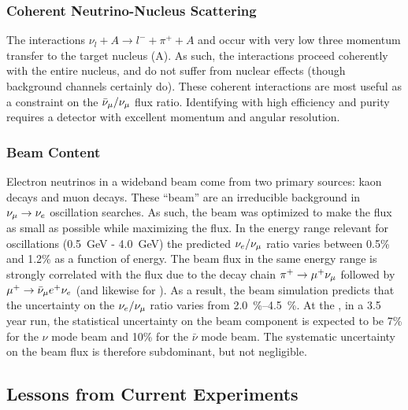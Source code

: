 \subsubsection{Coherent Neutrino-Nucleus Scattering}
The interactions $\nu_l + A \rightarrow l^- + \pi^+ + A$ and 
occur with very low three momentum transfer to the target nucleus (A).  As such, the interactions proceed coherently with the entire nucleus, and do not suffer from nuclear effects (though background channels certainly do). These coherent interactions are most useful as a constraint on the $\bar\nu_\mu/\nu_\mu$ flux ratio. Identifying with high efficiency and purity requires a detector with excellent momentum and angular resolution.

\subsubsection{Beam \nue Content}
\label{ssec:beam-nue}
Electron neutrinos in a wideband beam come from two primary sources: kaon decays and muon decays. These ``beam'' \nue are an irreducible background in $\nu_\mu \to \nu_e$ oscillation searches. As such, the  beam was optimized to make the \nue flux as small as possible while maximizing the \numu flux. In the energy range relevant for oscillations (\SI{0.5}{GeV} - \SI{4.0}{GeV}) the predicted $\nu_e/\nu_\mu$ ratio varies between 0.5\% and 1.2\% as a function of energy. The beam \nue flux in the same energy range is strongly correlated with the \numu flux due to the decay chain $\pi^+\to\mu^+\nu_\mu$ followed by $\mu^+ \to \bar\nu_\mu{} e^+ \nu_e $ (and likewise for \anue). As a result, the   beam simulation predicts that the uncertainty on the $\nu_e/\nu_\mu$ ratio varies from \SIrange{2.0}{4.5}{\%}. At the  , in a 3.5 year run, the statistical uncertainty on the beam \nue component is expected to be 7\% for the $\nu$ mode beam and 10\% for the $\bar{\nu}$ mode beam. The systematic uncertainty on the beam \nue flux is therefore subdominant, but not negligible.  



\subsection{Lessons from Current Experiments}
\label{ssec:exsum-nd-overview-lessons}

